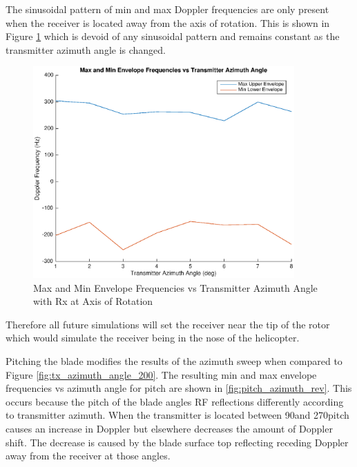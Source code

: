 The sinusoidal pattern of min and max Doppler frequencies are only present when the receiver is located away from the axis of rotation. This is shown in Figure \ref{fig:tx_azimuth_rx0} which is devoid of any sinusoidal pattern and remains constant as the transmitter azimuth angle is changed. 

\begin{figure}
	\begin{center}
		\includegraphics[width=10cm]{images/simulation/Azimuth_angle_rx0_max_doppler.eps}
		\caption{Max and Min Envelope Frequencies vs Transmitter Azimuth Angle with Rx at Axis of Rotation}
		\label{fig:tx_azimuth_rx0}
	\end{center}
\end{figure}

Therefore all future simulations will set the receiver near the tip of the rotor which would simulate the receiver being in the nose of the helicopter.

Pitching the blade modifies the results of the azimuth sweep when compared to Figure \ref{fig:tx_azimuth_angle_200}. The resulting min and max envelope frequencies vs azimuth angle for pitch are shown in \ref{fig:pitch_azimuth_rev}. This occurs because the pitch of the blade angles RF reflections differently according to transmitter azimuth. When the transmitter is located between 90\textdegree \space and 270\textdegree \space pitch causes an increase in Doppler but elsewhere decreases the amount of Doppler shift. The decrease is caused by the blade surface top reflecting receding Doppler away from the receiver at those angles.

